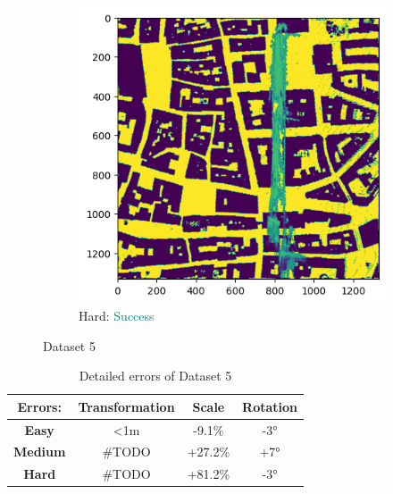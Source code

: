 \documentclass[11pt]{article}
\begin{document}
\begin{figure}[p]
        \vspace{1em}

        \begin{subfigure}{0.45\textwidth}
            \centering
            \includegraphics[width=\linewidth]{images/full/hard/5_6_2_hard}
            \caption{Hard: \textcolor{teal}{Success}}
            \label{fig:5_6_2_hard}
        \end{subfigure}
        \hfill

        \caption{Dataset 5}
        \label{fig:res_5_6_2}
    \end{figure}

    \begin{table}[p]
        \centering
        \begin{tabular}{|c|c|c|c|}
          \hline
          \textbf{Errors:} & \textbf{Transformation} & \textbf{Scale} & \textbf{Rotation} \\
          \hline
          \textbf{Easy}   & <1m  & -9.1\% & -3° \\
          \hline
          \textbf{Medium} & #TODO  & +27.2\% & +7° \\
          \hline
          \textbf{Hard}   & #TODO  & +81.2\% & -3° \\
          \hline
        \end{tabular}
        \caption{Detailed errors of Dataset 5}
        \label{tab:simpletable}
    \end{table}
\end{document}
